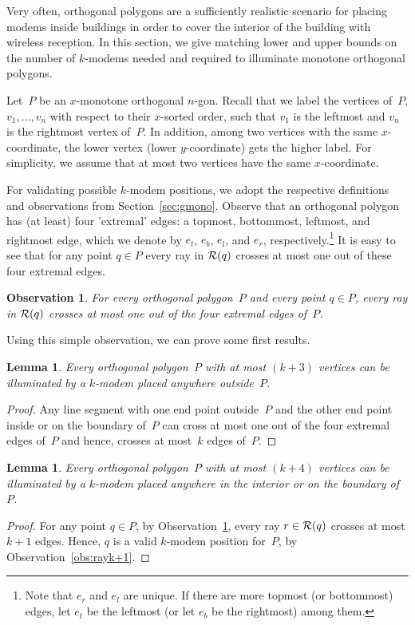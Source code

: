 \documentclass[A4]{article}
\newtheorem{lemma}[theorem]{Lemma}
\newtheorem{observation}[theorem]{Observation}
\begin{document}
Very often, orthogonal polygons are a sufficiently realistic scenario for placing modems inside buildings in order to cover the interior of the building with wireless reception.
In this section, we give matching lower and upper bounds on the number of \mbox{$k$-modems} needed and required to illuminate monotone orthogonal polygons.

Let~$P$ be an $x$-monotone orthogonal $n$-gon.
Recall that we label the vertices of~$P$, $v_1,\ldots,v_n$ with respect to their $x$-sorted order, such that $v_1$ is the leftmost and $v_n$ is the rightmost vertex of~$P$. In addition, among two vertices with the same $x$-coordinate, the lower vertex (lower $y$-coordinate) gets the higher label. 
For simplicity, we assume that at most two vertices have the same $x$-coordinate.

For validating possible \mbox{$k$-modem} positions, we adopt the respective definitions and observations from Section~\ref{sec:gmono}.
Observe that an orthogonal polygon has (at least) four 'extremal' edges: a topmost, bottommost, leftmost, and rightmost edge, which we denote by $e_t$, $e_b$, $e_l$, and $e_r$, respectively.\footnote{Note that $e_r$ and $e_l$ are unique. If there are more topmost (or bottommost) edges,  let $e_t$ be the leftmost  (or let $e_b$ be the rightmost) among them. }
It is easy to see that for any point $q\in P$ every ray in ${\cal R}(q)$ crosses at most one out of these four extremal edges.

\begin{observation}\label{obs:extremal}
For every orthogonal polygon~$P$ and every point $q\in P$, every ray in ${\cal R}(q)$ crosses at most one out of the four extremal edges of~$P$.
\end{observation}

Using this simple observation, we can prove some first results.

\begin{lemma}\label{lem:k+3}
  Every orthogonal polygon~$P$ with at most $(k+3)$ vertices can be illuminated by a \mbox{$k$-modem} placed anywhere outside~$P$.
\end{lemma}
\begin{proof}
  Any line segment with one end point outside~$P$ and the other end point inside or on the boundary of~$P$ can cross at most one out of the four extremal edges of~$P$ and hence, crosses at most~$k$ edges of~$P$. \end{proof}


\begin{lemma}\label{lem:k+4}
Every orthogonal polygon~$P$ with at most $(k+4)$ vertices can be illuminated by a \mbox{$k$-modem} placed anywhere in the interior or on the boundary of~$P$.
\end{lemma}
\begin{proof}
For any point $q\in P$, by Observation~\ref{obs:extremal}, every ray $r\in{\cal R}(q)$ crosses at most $k+1$ edges.
Hence, $q$ is a valid \mbox{$k$-modem} position for~$P$, by Observation~\ref{obs:rayk+1}. \end{proof}
\end{document}
